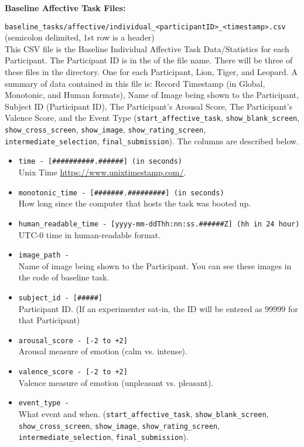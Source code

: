 \begin{description}
\bigskip\item\textbf{Baseline Affective Task Files:}
\medskip
\item\verb|baseline_tasks/affective/individual_<participantID>_<timestamp>.csv|\\
    (semicolon delimited, 1st row is a header)\\
    This CSV file is the Baseline Individual Affective Task Data/Statistics for
    each Participant. The Participant ID is in the of the file name. There will
    be three of these files in the directory. One for each Participant, Lion,
    Tiger, and Leopard. A summary of data contained in this file is: Record
    Timestamp (in Global, Monotonic, and Human formats), Name of Image being
    shown to the Participant, Subject ID (Participant ID), The Participant's
    Arousal Score, The Participant's Valence Score, and the Event Type
    (\verb|start_affective_task|, \verb|show_blank_screen|,
    \verb|show_cross_screen|, \verb|show_image|, \verb|show_rating_screen|,
    \verb|intermediate_selection|, \verb|final_submission|). The columns are
    described below.
    \begin{itemize}
        \item \verb|time - [##########.######] (in seconds)|\\
            Unix Time \href{https://www.unixtimestamp.com/}{https://www.unixtimestamp.com/}.
        \item \verb|monotonic_time - [#######.#########] (in seconds)|\\
            How long since the computer that hosts the task was booted up.
        \item \verb|human_readable_time - [yyyy-mm-ddThh:nn:ss.######Z] (hh in 24 hour)|\\
            UTC-0 time in human-readable format.
        \item \verb|image_path -|\\
            Name of image being shown to the Participant. You can see these images in the code of baseline task.
        \item \verb|subject_id - [#####]|\\
            Participant ID. (If an experimenter sat-in, the ID will be entered as 99999 for that Participant)
        \item \verb|arousal_score - [-2 to +2]|\\
            Arousal measure of emotion (calm vs. intense).
        \item \verb|valence_score - [-2 to +2]|\\
            Valence measure of emotion (unpleasant vs. pleasant).
        \item \verb|event_type -|\\
            What event and when.
            (\verb|start_affective_task|, \verb|show_blank_screen|,
            \verb|show_cross_screen|, \verb|show_image|, \verb|show_rating_screen|,
            \verb|intermediate_selection|, \verb|final_submission|).
    \end{itemize}



\end{description}
